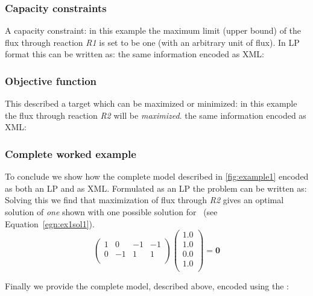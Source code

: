\subsubsection{Capacity constraints}
A capacity constraint: in this example the maximum limit (upper bound) of the flux through reaction \textit{R1} is set to be one (with an arbitrary unit of flux). In LP format this can be written as:
%
%
the same information encoded as XML:
%

\subsubsection{Objective function}      
This described a target which can be maximized or minimized: in this example the flux through reaction \textit{R2} will be \textit{maximized}.
%
%
the same information encoded as XML:
%

\subsubsection{Complete worked example}
To conclude we show how the complete model described in \ref{fig:example1} encoded as both an LP and as XML. Formulated as an LP the problem can be written as:
%
%
Solving this we find that maximization of flux through \textit{R2}
gives an optimal solution of \textit{one} shown with one possible solution
for \Jvec\ (see Equation~\ref{egn:ex1sol1}).
\begin{equation}\label{egn:ex1sol1}
  \left(
    \begin{array}{cccc}
        1 &  0 & -1 & -1 \\
        0 & -1 &  1 &  1 \\
    \end{array}
  \right)
  \left(
    \begin{array}{c}
        1.0 \\
        1.0 \\
        0.0 \\
        1.0 \\
    \end{array}
  \right)
  = \textbf{0}
\end{equation}

Finally we provide the complete model, described above, encoded using the \FBCPackage:
%

